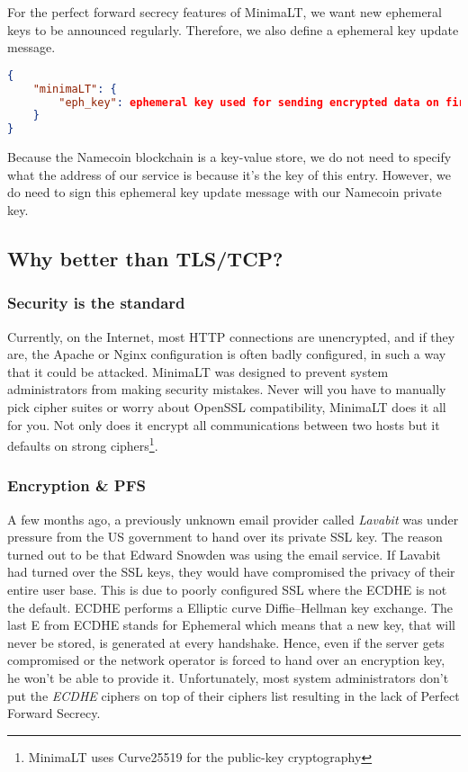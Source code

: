 \documentclass{vldb}
\begin{document}
For the perfect forward secrecy features of MinimaLT, we want new ephemeral keys to be announced regularly. Therefore, we also define a ephemeral key update message. 

\begin{lstlisting}[language=json,firstnumber=1]
{
    "minimaLT": {
        "eph_key": ephemeral key used for sending encrypted data on first RTT.
    }
}
\end{lstlisting}

Because the Namecoin blockchain is a key-value store, we do not need to specify what the address of our service is because it's the key of this entry. However, we do need to sign this ephemeral key update message with our Namecoin private key. 

\subsection{Why better than TLS/TCP?}

\subsubsection{Security is the standard}

Currently, on the Internet, most HTTP connections are unencrypted, and if they are, the Apache or Nginx configuration is often badly configured, in such a way that it could be attacked. MinimaLT was designed to prevent system administrators from making security mistakes. Never will you have to manually pick cipher suites or worry about OpenSSL compatibility, MinimaLT does it all for you. Not only does it encrypt all communications between two hosts but it defaults on strong ciphers\footnote{MinimaLT uses Curve25519 for the public-key cryptography}.

\subsubsection{Encryption \& PFS}

A few months ago, a previously unknown email provider called \emph{Lavabit} was under pressure from the US government to hand over its private SSL key. The reason turned out to be that Edward Snowden was using the email service. If Lavabit had turned over the SSL keys, they would have compromised the privacy of their entire user base. This is due to poorly configured SSL where the ECDHE is not the default. ECDHE performs a Elliptic curve Diffie–Hellman key exchange. The last E from ECDHE stands for Ephemeral which means that a new key, that will never be stored, is generated at every handshake. Hence, even if the server gets compromised or the network operator is forced to hand over an encryption key, he won't be able to provide it. Unfortunately, most system administrators don't put the \emph{ECDHE} ciphers on top of their ciphers list resulting in the lack of Perfect Forward Secrecy.
\end{document}
